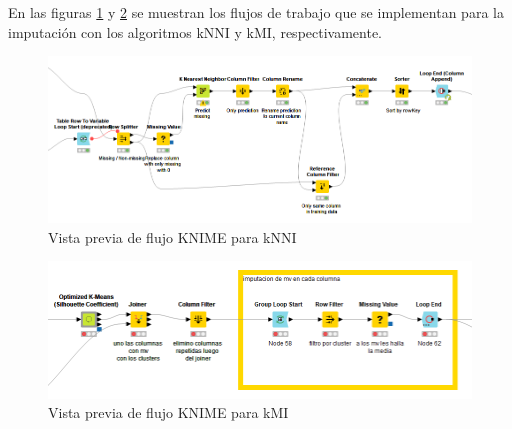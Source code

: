  En las figuras \ref{fig:flujo-knni} y \ref{fig:flujo-kmi} se muestran los flujos de trabajo que se implementan para la imputación con los algoritmos kNNI y kMI, respectivamente.
 
 \begin{figure}[H]
 	\centering
 	\includegraphics[width=0.9\linewidth]{"figuras/capi 2/preprocesado/flujo-knni"}
 	\caption{Vista previa de flujo KNIME para kNNI}
 	\label{fig:flujo-knni}
 \end{figure}
 
  \begin{figure}[H]
 	\centering
 	\includegraphics[width=0.9\linewidth]{"figuras/capi 2/preprocesado/flujo-kmi"}
 	\caption{Vista previa de flujo KNIME para kMI}
 	\label{fig:flujo-kmi}
 \end{figure}
 
 

